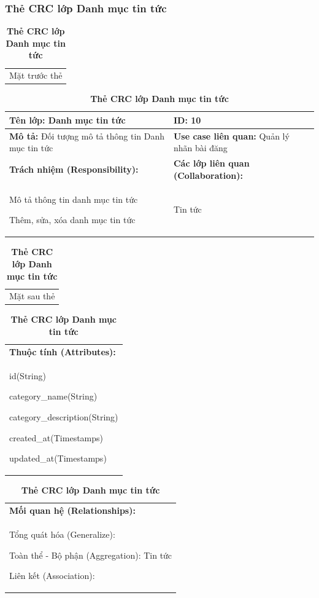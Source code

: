   \subsubsection{Thẻ CRC lớp Danh mục tin tức}
  \begin{table}[H]
    \caption{\bfseries \fontsize{12pt}{0pt}\selectfont Thẻ CRC lớp Danh mục tin tức}
    \centering
    \begin{tabularx}{0.9\textwidth}{X}
      Mặt trước thẻ
    \end{tabularx}
    \begin{tabularx}{0.9\textwidth}{|X|X|}
      \hline
      \textbf{Tên lớp:} Danh mục tin tức & \textbf{ID:} 10 \\
      \hline
      \textbf{Mô tả:} Đối tượng mô tả thông tin Danh mục tin tức & \textbf{Use case liên quan:}  Quản lý nhãn bài đăng\\
      \hline
      \textbf{Trách nhiệm (Responsibility):} & \textbf{Các lớp liên quan (Collaboration):} \\
      Mô tả thông tin danh mục tin tức

      Thêm, sửa, xóa danh mục tin tức
      & 
      Tin tức
      \\
      \hline
    \end{tabularx}
    \begin{tabularx}{0.9\textwidth}{X}
      Mặt sau thẻ
    \end{tabularx}
    \begin{tabularx}{0.9\textwidth}{|X|}
      \hline
      \textbf{Thuộc tính (Attributes):} \\
      id(String) 
      
      category\_name(String)

      category\_description(String)

      created\_at(Timestamps)

      updated\_at(Timestamps)
      \\
      \hline
    \end{tabularx}
    \begin{tabularx}{0.9\textwidth}{|X|}
      \textbf{Mối quan hệ (Relationships):} \\
      Tổng quát hóa (Generalize):  

      Toàn thể - Bộ phận (Aggregation): Tin tức
      
      Liên kết (Association): 
      \\
      \hline
    \end{tabularx}
  \end{table}

